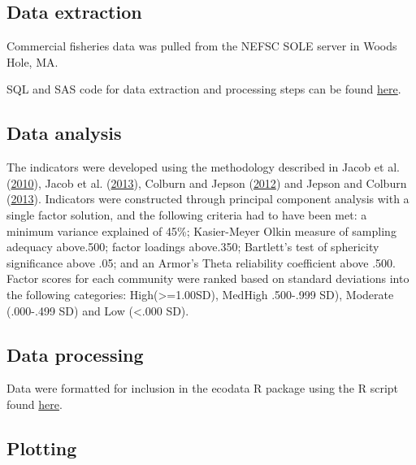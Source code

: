 \documentclass[
]{book}
\begin{document}
\hypertarget{data-extraction-9}{%
\subsection{Data extraction}\label{data-extraction-9}}

Commercial fisheries data was pulled from the NEFSC SOLE server in Woods Hole, MA.

SQL and SAS code for data extraction and processing steps can be found \href{https://github.com/NOAA-EDAB/tech-doc/tree/master/R/stored_scripts/comm_rel_vuln_extraction.sql}{here}.

\hypertarget{data-analysis-9}{%
\subsection{Data analysis}\label{data-analysis-9}}

The indicators were developed using the methodology described in Jacob et al. (\protect\hyperlink{ref-Jacob2010}{2010}), Jacob et al. (\protect\hyperlink{ref-Jacob2013}{2013}), Colburn and Jepson (\protect\hyperlink{ref-colburn_social_2012}{2012}) and Jepson and Colburn (\protect\hyperlink{ref-jepson_development_2013}{2013}). Indicators were constructed through principal component analysis with a single factor solution, and the following criteria had to have been met: a minimum variance explained of 45\%; Kasier-Meyer Olkin measure of sampling adequacy above.500; factor loadings above.350; Bartlett's test of sphericity significance above .05; and an Armor's Theta reliability coefficient above .500. Factor scores for each community were ranked based on standard deviations into the following categories: High(\textgreater{}=1.00SD), MedHigh .500-.999 SD), Moderate (.000-.499 SD) and Low (\textless{}.000 SD).

\hypertarget{data-processing-8}{%
\subsection{Data processing}\label{data-processing-8}}

Data were formatted for inclusion in the ecodata R package using the R script found \href{https://raw.githubusercontent.com/NOAA-EDAB/ecodata/master/data-raw/get_engagement_reliance.R}{here}.

\hypertarget{plotting-7}{%
\subsection{Plotting}\label{plotting-7}}
\end{document}
